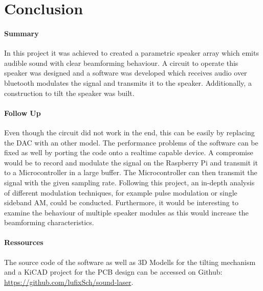 \chapter{Conclusion}


\subsubsection*{Summary}

In this project it was achieved to created a parametric speaker array which emits audible sound with clear beamforming behaviour. A circuit to operate this speaker was designed and a software was developed which receives audio over bluetooth modulates the signal and transmits it to the speaker. Additionally, a construction to tilt the speaker was built.
%
\subsubsection*{Follow Up}
%
Even though the circuit did not work in the end, this can be easily by replacing the DAC with an other model. The performance problems of the software can be fixed as well by porting the code onto a realtime capable device. A compromise would be to record and modulate the signal on the Raspberry Pi and transmit it to a Microcontroller in a large buffer. The Microcontroller can then transmit the signal with the given sampling rate.\p
%
Following this project, an in-depth analysis of different modulation techniques, for example pulse modulation or single sideband AM, could be conducted. Furthermore, it would be interesting to examine the behaviour of multiple speaker modules as this would increase the beamforming characteristics.
%
\subsubsection*{Ressources}
%
The source code of the software as well as 3D Modells for the tilting mechanism and a KiCAD project for the PCB design can be accessed on Github: \href{https://github.com/lufixSch/sound-laser}{https://github.com/lufixSch/sound-laser}.